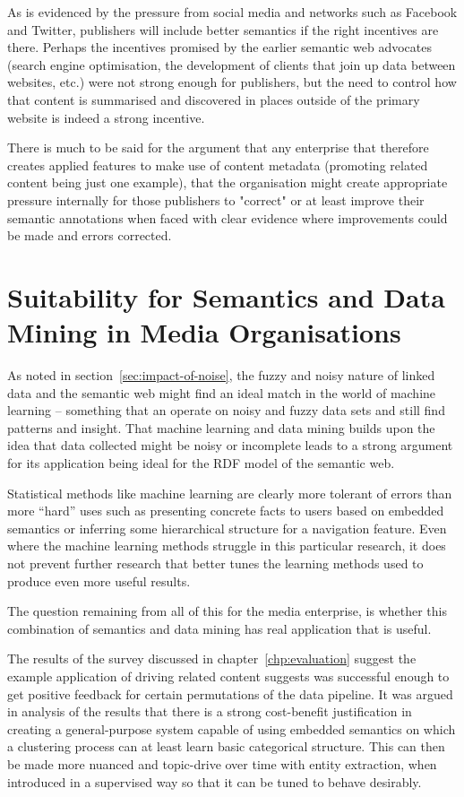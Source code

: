 As is evidenced by the pressure from social media and networks such as
Facebook and Twitter, publishers will include better semantics if the right
incentives are there. Perhaps the incentives promised by the earlier semantic
web advocates (search engine optimisation, the development of clients that
join up data between websites, etc.) were not strong enough for publishers,
but the need to control how that content is summarised and discovered in
places outside of the primary website is indeed a strong incentive.

There is much to be said for the argument that any enterprise that therefore
creates applied features to make use of content metadata (promoting related
content being just one example), that the organisation might create appropriate
pressure internally for those publishers to "correct" or at least improve
their semantic annotations when faced with clear evidence where improvements
could be made and errors corrected.

\section{Suitability for Semantics and Data Mining in Media Organisations}

As noted in section~\ref{sec:impact-of-noise}, the fuzzy and noisy nature
of linked data and the semantic web might find an ideal match in the world
of machine learning -- something that an operate on noisy and fuzzy data sets
and still find patterns and insight. That machine learning and data mining
builds upon the idea that data collected might be noisy or incomplete leads
to a strong argument for its application being ideal for the RDF model of
the semantic web.

Statistical methods like machine learning are clearly more tolerant of errors
than more ``hard'' uses such as presenting concrete facts to users based on
embedded semantics or inferring some hierarchical structure for a navigation
feature. Even where the machine learning methods struggle in this particular
research, it does not prevent further research that better tunes the learning
methods used to produce even more useful results.

The question remaining from all of this for the media enterprise, is whether
this combination of semantics and data mining has real application that is
useful.

The results of the survey discussed in chapter~\ref{chp:evaluation}
suggest the example application of driving related content suggests
was successful enough to get positive feedback for certain permutations
of the data pipeline. It was argued in analysis of the results that
there is a strong cost-benefit justification in creating a
general-purpose system capable of using embedded semantics on which
a clustering process can at least learn basic categorical structure.
This can then be made more nuanced and topic-drive over time with
entity extraction, when introduced in a supervised way so that it can
be tuned to behave desirably.

